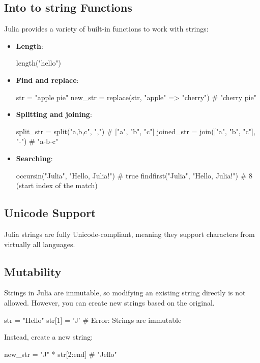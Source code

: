 \documentclass{report}
\begin{document}
    \bigbreak \noindent 
    \subsection{Into to string Functions }
    \bigbreak \noindent 
    Julia provides a variety of built-in functions to work with strings:
    \begin{itemize}
        \item \textbf{Length}:
            \bigbreak \noindent 
            \begin{jlcode}
            length("hello")
            \end{jlcode}
        \item \textbf{Find and replace}:
            \bigbreak \noindent 
            \begin{jlcode}
                str = "apple pie"
                new_str = replace(str, "apple" => "cherry")  # "cherry pie"
            \end{jlcode}
        \item \textbf{Splitting and joining}:
            \bigbreak \noindent 
            \begin{jlcode}
                split_str = split("a,b,c", ",")  # ["a", "b", "c"]
                joined_str = join(["a", "b", "c"], "-")  # "a-b-c"
            \end{jlcode}
        \item \textbf{Searching}:
            \bigbreak \noindent 
            \begin{jlcode}
                occursin("Julia", "Hello, Julia!")  # true
                findfirst("Julia", "Hello, Julia!")  # 8 (start index of the match)
            \end{jlcode}
    \end{itemize}
    \bigbreak \noindent 
    \subsection{Unicode Support}
    \bigbreak \noindent 
    Julia strings are fully Unicode-compliant, meaning they support characters from virtually all languages.
    \bigbreak \noindent 
    \subsection{Mutability}
    \bigbreak \noindent 
    Strings in Julia are immutable, so modifying an existing string directly is not allowed. However, you can create new strings based on the original.
    \bigbreak \noindent 
    \begin{jlcode}
    str = "Hello"
    str[1] = 'J'  # Error: Strings are immutable
    \end{jlcode}
    \bigbreak \noindent 
    Instead, create a new string:
    \bigbreak \noindent 
    \begin{jlcode}
    new_str = "J" * str[2:end]  # "Jello"
    \end{jlcode}
    \bigbreak \noindent 
\end{document}
